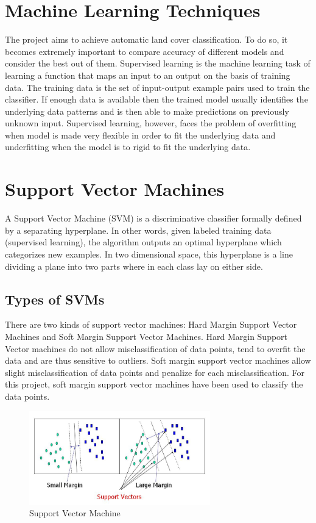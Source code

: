 \documentclass[12pt, a4paper]{report}
\begin{document}
\section{Machine Learning Techniques}
The project aims to achieve automatic land cover classification. To do so, it becomes extremely important to compare accuracy of different models and  consider the best out of them.
Supervised learning is the machine learning task of learning a function that maps an input to an output on the basis of training data.\cite{supervisedlearningone, supervisedlearningtwo} The training data is the set of input-output example pairs used to train the classifier. If enough data is available then the trained model usually identifies the underlying data patterns and is then able to make predictions on previously unknown input. Supervised learning, however, faces the problem of overfitting when model is made very flexible in order to fit the underlying data and underfitting when the model is to rigid to fit the underlying data.
\section{Support Vector Machines}
A Support Vector Machine (SVM) is a discriminative classifier formally defined by a separating hyperplane. In other words, given labeled training data (supervised learning), the algorithm outputs an optimal hyperplane which categorizes new examples. In two dimensional space, this hyperplane is a line dividing a plane into two parts where in each class lay on either side.\cite{supportvectormachines}
\subsection{Types of SVMs}
There are two kinds of support vector machines: Hard Margin Support Vector Machines and Soft Margin Support Vector Machines.
Hard Margin Support Vector machines do not allow misclassification of data points, tend to overfit the data and are thus sensitive to outliers. Soft margin support vector machines allow slight misclassification of data points and penalize for each misclassification.
For this project, soft margin support vector machines have been used to classify the data points.
\begin{figure}[h]
\centering
\includegraphics[width=0.7\textwidth]{supportvectormachines.jpg}
\caption{Support Vector Machine}
\end{figure}
\end{document}
